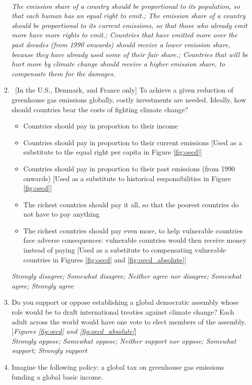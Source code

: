 \documentclass[12pt,english]{article}
\begin{document}
\begin{enumerate}
\\ \textit{The emission share of a country should be proportional to its population, so that each human has an equal right to emit.; The emission share of a country should be proportional to its current emissions, so that those who already emit more have more rights to emit.; Countries that have emitted more over the past decades (from 1990 onwards) should receive a lower emission share, because they have already used some of their fair share.; Countries that will be hurt more by climate change should receive a higher emission share, to compensate them for the damages.}
\item \label{q:burden_sharing_asterisk} ~[In the U.S., Denmark, and France only] To achieve a given reduction of greenhouse gas emissions globally, costly investments are needed. %
Ideally, how should countries bear the costs of fighting climate change?
 \begin{itemize}
\item Countries should pay in proportion to their income
\item Countries should pay in proportion to their current emissions [Used as a substitute to the equal right per capita in Figure \ref{fig:oecd}]
\item Countries should pay in proportion to their past emissions (from 1990 onwards) [Used as a substitute to historical responsibilities in Figure \ref{fig:oecd}]
\item The richest countries should pay it all, so that the poorest countries do not have to pay anything
\item The richest countries should pay even more, to help vulnerable countries face adverse consequences: vulnerable countries would then receive money instead of paying [Used as a substitute to compensating vulnerable countries in Figures \ref{fig:oecd} and \ref{fig:oecd_absolute}]
\end{itemize} 
\textit{Strongly disagree; Somewhat disagree; Neither agree nor disagree; Somewhat agree; Strongly agree}
\item Do you support or oppose establishing a global democratic assembly whose role would be to draft international treaties against climate change? Each adult across the world would have one vote to elect members of the assembly. [\textit{Figures \ref{fig:oecd} and \ref{fig:oecd_absolute}}]
\\ \textit{Strongly oppose; Somewhat oppose; Neither support nor oppose; Somewhat support; Strongly support}
\item Imagine the following policy: a global tax on greenhouse gas emissions funding a global basic income. 

\end{enumerate}
\end{document}
